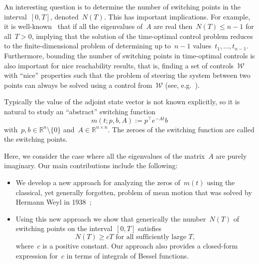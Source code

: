 \documentclass[final ]{IEEEtran}
\newcommand {\R}{\mathbb R}
\newcommand{\be}{\begin{equation}}
\newcommand{\ee}{\end{equation}}
\begin{document}
 
An interesting  question is to determine     the number of switching points   in the interval~$[0,T]$, denoted~$N(T)$. This   has important implications. For example,
it is well-known~\cite[Theorem~6-8]{athans_falb} that if all the eigenvalues of~$A$  are real then~$N(T)\leq n-1$ for all~$T>0$,  implying that the solution of the time-optimal control problem reduces to the finite-dimensional problem of  determining   up to~$n-1$ values~$t_1,\dots,t_{n-1}$.  Furthermore,   bounding the number of switching points in time-optimal controls
is also important for nice reachability results, that is, finding a set of controls~$\mathcal{W}$ with ``nice'' properties such that the  problem of steering the system between two points can always  be solved using a control from~$\mathcal W$ (see, e.g.~\cite{suss_nice_reach,levinson_select,SHARON_3_nilp}).


Typically the value of the adjoint state vector  is   not known explicitly, so it is natural to      study an ``abstract'' 
switching
function
\be\label{eq:abst_m}
m(t;p,b, A):=p^\top e^{-At}b
\ee
with~$p,b\in\R^n\setminus\{0\}$ and~$A\in\R^{n\times n}$. 
 The zeroes of the switching function are called the switching points.
 
 Here, we consider the case where all  the eigenvalues of the matrix~$A$ are  purely imaginary. Our main contributions include the following: 
 \begin{itemize}
     \item We develop a new approach for analyzing  the zeros of~$m(t)$ using the classical, yet generally forgotten, problem of mean motion that was solved  by Hermann Weyl in 1938~\cite{Weyl_meanmotion};
     \item  Using this new approach we show that 
   generically  the number~$N(T)$ of switching   points on the interval~$[0,T]$ 
satisfies
\begin{equation}\label{asymp_in}
N(T)\geq c T \text{ for all sufficiently large } T,
\end{equation}
where~$c$ is a positive constant. Our approach also
 provides a   closed-form expression
for~$c$ in terms of integrals of Bessel functions.
 \end{itemize}

 
 

\end{document}

